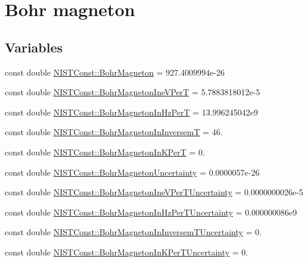 \hypertarget{group___n_i_s_t_const-_bohr_magneton}{}\section{Bohr magneton}
\label{group___n_i_s_t_const-_bohr_magneton}
\subsection*{Variables}
\begin{DoxyCompactItemize}
\item 
const double \hyperlink{group___n_i_s_t_const-_bohr_magneton_gaace59be8951a23257cedcbef8f320c66}{N\+I\+S\+T\+Const\+::\+Bohr\+Magneton} = 927.\+4009994e-\/26
\item 
const double \hyperlink{group___n_i_s_t_const-_bohr_magneton_ga8b97d10b13a2c5de4f0d268370bc3c50}{N\+I\+S\+T\+Const\+::\+Bohr\+Magneton\+Ine\+V\+PerT} = 5.\+7883818012e-\/5
\item 
const double \hyperlink{group___n_i_s_t_const-_bohr_magneton_ga0c3cc268d0e1abc4703ea8f2c11ccab8}{N\+I\+S\+T\+Const\+::\+Bohr\+Magneton\+In\+Hz\+PerT} = 13.\+996245042e9
\item 
const double \hyperlink{group___n_i_s_t_const-_bohr_magneton_ga5d2bdfa6451f3966c0e4ce0d76da7880}{N\+I\+S\+T\+Const\+::\+Bohr\+Magneton\+In\+InversemT} = 46.
\item 
const double \hyperlink{group___n_i_s_t_const-_bohr_magneton_ga4fcb81eff2823748ae5fced898ecc0ec}{N\+I\+S\+T\+Const\+::\+Bohr\+Magneton\+In\+K\+PerT} = 0.
\item 
const double \hyperlink{group___n_i_s_t_const-_bohr_magneton_gaf2591aab0321fec9056cc1a8479cb05b}{N\+I\+S\+T\+Const\+::\+Bohr\+Magneton\+Uncertainty} = 0.\+0000057e-\/26
\item 
const double \hyperlink{group___n_i_s_t_const-_bohr_magneton_gaaecd1151f7f9e12288a05ba80fb94bbd}{N\+I\+S\+T\+Const\+::\+Bohr\+Magneton\+Ine\+V\+Per\+T\+Uncertainty} = 0.\+0000000026e-\/5
\item 
const double \hyperlink{group___n_i_s_t_const-_bohr_magneton_ga6bbb08744c1f404415a645e006c75a0b}{N\+I\+S\+T\+Const\+::\+Bohr\+Magneton\+In\+Hz\+Per\+T\+Uncertainty} = 0.\+000000086e9
\item 
const double \hyperlink{group___n_i_s_t_const-_bohr_magneton_ga9aca7b3ac1fac66baa5e4b05281ac5d4}{N\+I\+S\+T\+Const\+::\+Bohr\+Magneton\+In\+Inversem\+T\+Uncertainty} = 0.
\item 
const double \hyperlink{group___n_i_s_t_const-_bohr_magneton_ga25a3b7882df7b01e29f7d0ec090a6f91}{N\+I\+S\+T\+Const\+::\+Bohr\+Magneton\+In\+K\+Per\+T\+Uncertainty} = 0.

\end{DoxyCompactItemize}
